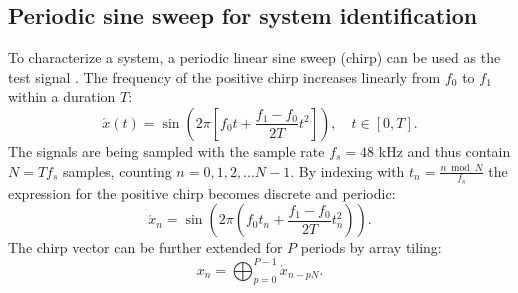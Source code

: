 \documentclass{article}
\begin{document}
\subsection{Periodic sine sweep for system identification}
To characterize a system, a periodic linear sine sweep (chirp) can be used as the test signal \cite{farina2000}. 
The frequency of the positive chirp increases linearly from $f_0$ to $f_1$ within a duration $T$:
\begin{equation}
    \acute{x}(t) = \sin\left(2\pi \left[ f_0 t + \frac{f_1 - f_0}{2T} t^2 \right]\right), \quad t \in [0, T].
\end{equation}
The signals are being sampled with the sample rate $f_s=48$ kHz and thus contain $N=T f_s$ samples, counting $n=0,1,2, ... N-1$. By indexing with $t_n = \frac{n \bmod N}{f_s}$ the expression for the positive chirp becomes discrete and periodic:
\begin{equation}
\acute{x}_n = \sin\left(2\pi \left( f_0 t_n + \frac{f_1 - f_0}{2T} t_n^2 \right)\right).
\end{equation}
The chirp vector can be further extended for $P$ periods by array tiling:
\begin{equation}
x_{n} = \bigoplus_{p=0}^{P-1} \acute{x}_{n - pN}.
\end{equation}
\end{document}
